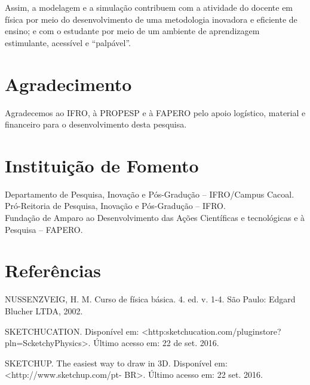 \documentclass[article,12pt,onesidea,4paper,english,brazil]{abntex2}
\begin{document}
	Assim, a modelagem e a simulação contribuem com a atividade do docente em física por meio do desenvolvimento de uma metodologia inovadora e eficiente de ensino; e com o estudante por meio de um ambiente de aprendizagem estimulante, acessível e “palpável”.

	\section*{Agradecimento}
	
	Agradecemos ao IFRO, à PROPESP e à FAPERO pelo apoio logístico, material e financeiro para o desenvolvimento desta pesquisa.
	
	\section*{Instituição de Fomento}
	
Departamento de Pesquisa, Inovação e Pós-Gradução – IFRO/Campus Cacoal. Pró-Reitoria de Pesquisa, Inovação e Pós-Gradução – IFRO.
\\Fundação de Amparo ao Desenvolvimento das Ações Científicas e tecnológicas e à Pesquisa – FAPERO.

	
	\section*{Referências}
		\noindent NUSSENZVEIG, H. M. Curso de física básica. 4. ed. v. 1-4. São Paulo: Edgard Blucher LTDA, 2002.
		
	\noindent	SKETCHUCATION.	Disponível	em:
		<http:sketchucation.com/pluginstore?pln=ScketchyPhysics>. Último acesso em: 22 de set. 2016.
		
	\noindent	SKETCHUP. The easiest way to draw in 3D. Disponível em: <http://www.sketchup.com/pt- BR>. Último acesso em: 22 set. 2016.
\end{document}
